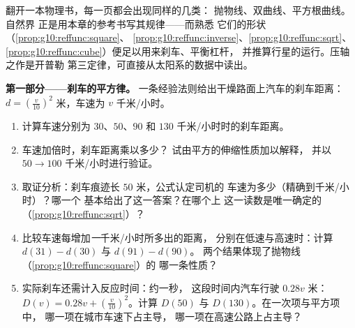 \begin{problem}
\label{pb:g10:reffunc:1}
翻开一本物理书，每一页都会出现同样的几类：
抛物线、双曲线、平方根曲线。自然界
正是用本章的参考书写其规律——而熟悉
它们的形状（\cref{prop:g10:reffunc:square}、
\cref{prop:g10:reffunc:inverse}、\cref{prop:g10:reffunc:sqrt}、
\cref{prop:g10:reffunc:cube}）便足以用来刹车、平衡杠杆，
并推算行星的运行。压轴之作是开普勒
第三定律，可直接从太阳系的数据中读出。

\medskip
\noindent\textbf{第一部分——刹车的平方律。}
一条经验法则给出干燥路面上汽车的刹车距离：
$d = \left(\frac{v}{10}\right)^{2}$ 米，车速为 $v$ 千米/小时。
\begin{enumerate}
  \item 计算车速分别为 $30$、$50$、$90$ 和
        $130$ 千米/小时时的刹车距离。
  \item 车速加倍时，刹车距离乘以多少？
        试由平方的伸缩性质加以解释，
        并以 $50 \to 100$ 千米/小时进行验证。
  \item 取证分析：刹车痕迹长 $50$ 米，公式认定司机的
        车速为多少（精确到千米/小时）？哪一个
        基本给出了这一答案？在哪个上
        这一读数是唯一确定的
        （\cref{prop:g10:reffunc:sqrt}）？
  \item 比较车速每增加\emph{一}千米/小时所多出的距离，
        分别在低速与高速时：计算
        $d(31) - d(30)$ 与 $d(91) - d(90)$。
        两个结果体现了抛物线（\cref{prop:g10:reffunc:square}）的
        哪一条性质？
  \item 实际刹车还需计入反应时间：约一秒，
        这段时间内汽车行驶 $0.28v$ 米：
        $D(v) = 0.28v + \left(\frac{v}{10}\right)^2$。计算
        $D(50)$ 与 $D(130)$。在一次项与平方项中，
        哪一项在城市车速下占主导，
        哪一项在高速公路上占主导？
\end{enumerate}


\end{problem}
